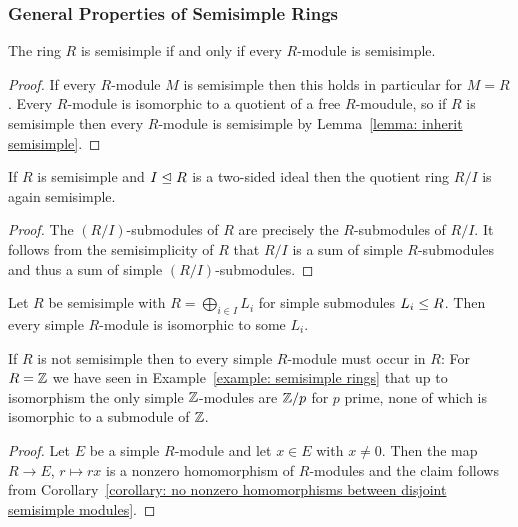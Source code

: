 \subsubsection{General Properties of Semisimple Rings}


\begin{proposition}
  The ring $R$ is semisimple if and only if every $R$-module is semisimple.
\end{proposition}


\begin{proof}
  If every $R$-module $M$ is semisimple then this holds in particular for $M = R$.
  Every $R$-module is isomorphic to a quotient of a free $R$-moudule, so if $R$ is semisimple then every $R$-module is semisimple by Lemma~\ref{lemma: inherit semisimple}.
\end{proof}


\begin{corollary}
  \label{corollary: quotients of ss rings are again ss}
 If $R$ is semisimple and $I \trianglelefteq R$ is a two-sided ideal then the quotient ring $R/I$ is again semisimple. 
\end{corollary}


\begin{proof}
  The $(R/I)$-submodules of $R$ are precisely the $R$-submodules of $R/I$.
  It follows from the semisimplicity of $R$ that $R/I$ is a sum of simple $R$-submodules and thus a sum of simple $(R/I)$-submodules.
\end{proof}


\begin{lemma}
  \label{lemma: simple module of semisimple ring is direct summand}
  Let $R$ be semisimple with $R = \bigoplus_{i \in I} L_i$ for simple submodules $L_i \leq R$.
  Then every simple $R$-module is isomorphic to some $L_i$.
\end{lemma}


\begin{warning}
  \label{warning: non ss ring does not have to contain simple modules}
  If $R$ is not semisimple then to every simple $R$-module must occur in $R$:
  For $R = \mathbb{Z}$ we have seen in Example~\ref{example: semisimple rings} that up to isomorphism the only simple $\mathbb{Z}$-modules are $\mathbb{Z}/p$ for $p$ prime, none of which is isomorphic to a submodule of $\mathbb{Z}$.
\end{warning}


\begin{proof}
  Let $E$ be a simple $R$-module and let $x \in E$ with $x \neq 0$.
  Then the map $R \to E$, $r \mapsto rx$ is a nonzero homomorphism of $R$-modules and the claim follows from Corollary~\ref{corollary: no nonzero homomorphisms between disjoint semisimple modules}.
\end{proof}


